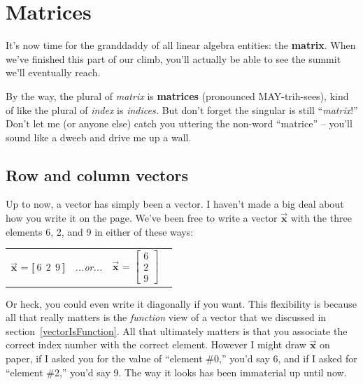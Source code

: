 


\chapter{Matrices}

It's now time for the granddaddy of all linear algebra entities: the
\textbf{matrix}. When we've finished this part of our climb, you'll actually be
able to see the summit we'll eventually reach.

By the way, the plural of \textit{matrix} is \textbf{matrices} (pronounced
MAY-trih-sees), kind of like the plural of \textit{index} is \textit{indices.}
But don't forget the singular is still ``\textit{matrix}!'' Don't let me (or
anyone else) catch you uttering the non-word ``matrice'' -- you'll sound like a
dweeb and drive me up a wall.

\section{Row and column vectors}

Up to now, a vector has simply been a vector. I haven't made a big deal about
how you write it on the page. We've been free to write a vector
$\overrightarrow{\textbf{x}}$ with the three elements 6, 2, and 9 in either of
these ways:

\vspace{-.15in}
\begin{center}
\begin{tabular}{ccc}
$\overrightarrow{\textbf{x}}$ = \textbf{[}$\ 6\ \ 2\ \ 9\ $\textbf{]} &
\quad\quad \textit{...or...} \quad\quad &
$\overrightarrow{\textbf{x}}$ = $\begin{bmatrix} 6 \\ 2 \\ 9 \end{bmatrix}$ \ 
\end{tabular}
\end{center}
\vspace{-.15in}


Or heck, you could even write it diagonally if you want. This flexibility is
because all that really matters is the \textit{function} view of a vector that
we discussed in section~\ref{vectorIsFunction}. All that ultimately matters is
that you associate the correct index number with the correct element. However I
might draw $\overrightarrow{\textbf{x}}$ on paper, if I asked you for the value
of ``element \#0,'' you'd say 6, and if I asked for ``element \#2,'' you'd say
9. The way it looks has been immaterial up until now.

